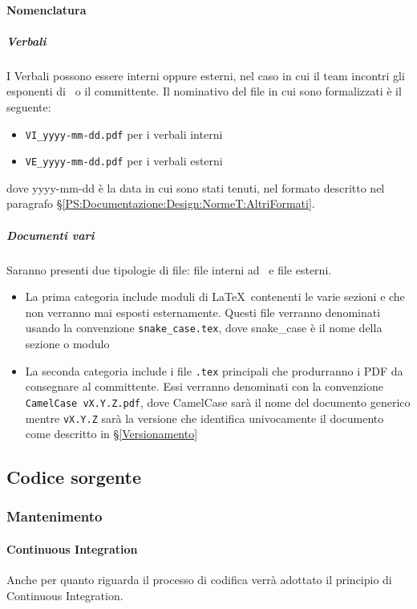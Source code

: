 			\paragraph{Nomenclatura} %

			\subparagraph{Verbali}	\label{NomenclaturaVerbali}
			I Verbali  possono essere interni oppure esterni, nel caso in cui il team incontri gli esponenti di \II\ o il committente.
			Il nominativo del file in cui sono formalizzati è il seguente:
			\begin{itemize}
				\item \texttt{VI\_yyyy-mm-dd.pdf} per i verbali interni
				\item \texttt{VE\_yyyy-mm-dd.pdf} per i verbali esterni
			\end{itemize}
			dove yyyy-mm-dd è la data in cui sono stati tenuti, nel formato descritto nel paragrafo \S\ref{PS:Documentazione:Design:NormeT:AltriFormati}.

			\subparagraph{Documenti vari}
			Saranno presenti due tipologie di file: file interni ad \gruppo\ e file esterni.
			\begin{itemize}
				\item La prima categoria include moduli di \LaTeX\ contenenti le varie sezioni e che non verranno mai esposti esternamente. Questi file verranno
					denominati usando la convenzione \texttt{snake\_case.tex}, dove snake\_case è il nome della sezione o modulo
				\item La seconda categoria include i file \texttt{.tex} principali che produrranno i PDF da consegnare al committente. Essi verranno denominati
				con la convenzione \mbox{\texttt{CamelCase vX.Y.Z.pdf}}, dove CamelCase sarà il nome del documento generico mentre \texttt{vX.Y.Z}
				sarà la versione che identifica univocamente il documento come descritto in \S\ref{Versionamento}
			\end{itemize}
		

	\subsection{Codice sorgente}\label{PS:Codice}
	
	    \subsubsection{Mantenimento}\label{MantenimentoCodice}
	    
		\paragraph{Continuous Integration}\label{CI}
		Anche per quanto riguarda il processo di codifica verrà adottato il principio di Continuous Integration.

